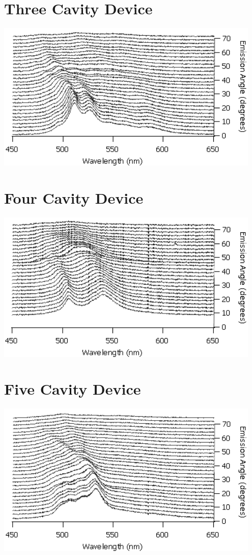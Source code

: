 \documentclass{report}
\begin{document}
    \section*{Three Cavity Device}
    \begin{center}
    \includegraphics[width=0.95\textwidth]{images/n3_waterfall.png}
    \end{center}
    
    \section*{Four Cavity Device}
    \begin{center}
    \includegraphics[width=0.95\textwidth]{images/n4_waterfall.png}
    \end{center}
    
    \section*{Five Cavity Device}
    \begin{center}
    \includegraphics[width=0.95\textwidth]{images/n5_waterfall.png}
    \end{center}
\end{document}
